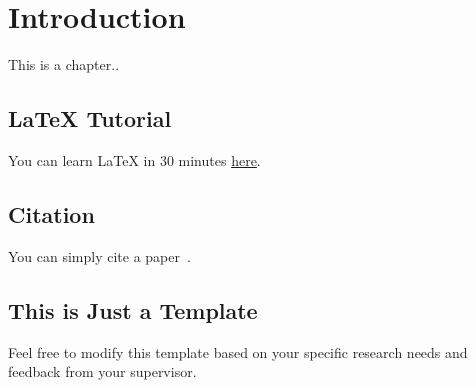 \chapter{Introduction}
\noindent
This is a chapter..



\section{LaTeX Tutorial}

You can learn LaTeX in 30 minutes \href{https://www.overleaf.com/learn/latex/Learn_LaTeX_in_30_minutes}{here}.


\section{Citation}

You can simply cite a paper~\citep{karunarathna2024crucial}.


\section{This is Just a Template}

Feel free to modify this template based on your specific research needs and feedback from your supervisor.
